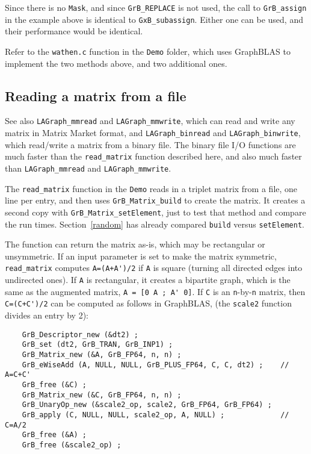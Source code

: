 \documentclass[12pt]{article}
\begin{document}
Since there is no \verb'Mask', and since \verb'GrB_REPLACE' is not used, the call
to \verb'GrB_assign' in the example above is identical to \verb'GxB_subassign'.
Either one can be used, and their performance would be identical.

Refer to the \verb'wathen.c' function in the \verb'Demo' folder, which
uses GraphBLAS to implement the two methods above, and two additional ones.

\subsection{Reading a matrix from a file}
\label{read}

See also \verb'LAGraph_mmread' and \verb'LAGraph_mmwrite', which
can read and write any matrix in Matrix Market format, and
\verb'LAGraph_binread' and \verb'LAGraph_binwrite', which read/write a matrix
from a binary file.  The binary file I/O functions are much faster than
the \verb'read_matrix' function described here, and also much faster than
\verb'LAGraph_mmread' and \verb'LAGraph_mmwrite'.

The \verb'read_matrix' function in the \verb'Demo' reads in a triplet matrix
from a file, one line per entry, and then uses \verb'GrB_Matrix_build' to
create the matrix.  It creates a second copy with \verb'GrB_Matrix_setElement',
just to test that method and compare the run times.
Section~\ref{random} has already compared
\verb'build' versus \verb'setElement'.

The function can return the matrix as-is, which may be rectangular or
unsymmetric.  If an input parameter is set to make the matrix symmetric,
\verb'read_matrix' computes \verb"A=(A+A')/2" if \verb'A' is square (turning
all directed edges into undirected ones).  If \verb'A' is rectangular, it
creates a bipartite graph, which is the same as the augmented matrix,
\verb"A = [0 A ; A' 0]".
If \verb'C' is an \verb'n'-by-\verb'n' matrix, then \verb"C=(C+C')/2" can be
computed as follows in GraphBLAS, (the \verb'scale2' function divides an entry
by 2):

    \vspace{-0.05in}
    {\footnotesize
    \begin{verbatim}
    GrB_Descriptor_new (&dt2) ;
    GrB_set (dt2, GrB_TRAN, GrB_INP1) ;
    GrB_Matrix_new (&A, GrB_FP64, n, n) ;
    GrB_eWiseAdd (A, NULL, NULL, GrB_PLUS_FP64, C, C, dt2) ;    // A=C+C'
    GrB_free (&C) ;
    GrB_Matrix_new (&C, GrB_FP64, n, n) ;
    GrB_UnaryOp_new (&scale2_op, scale2, GrB_FP64, GrB_FP64) ;
    GrB_apply (C, NULL, NULL, scale2_op, A, NULL) ;             // C=A/2
    GrB_free (&A) ;
    GrB_free (&scale2_op) ; \end{verbatim}}
\end{document}

